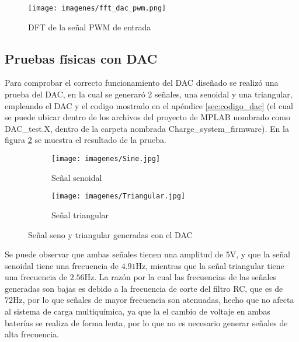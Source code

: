     \begin{figure}[H]
        \centering
        \texttt{[image: imagenes/fft\_dac\_pwm.png]}
        \caption{DFT de la señal PWM de entrada}
        \label{fig:sim_dac_fft_in}
    \end{figure}

    \subsection{Pruebas físicas con DAC}

    Para comprobar el correcto funcionamiento del DAC diseñado se realizó una
    prueba del DAC, en la cual se generaró 2 señales, una senoidal y una triangular,
    empleando el DAC y el codigo mostrado en el apéndice \ref{sec:codigo_dac} (el cual 
    se puede ubicar dentro de los archivos del proyecto de MPLAB nombrado como
    DAC\_test.X, dentro de la carpeta nombrada Charge\_system\_firmware).
     En la figura \ref{fig:dac_test_sine}
    se muestra el resultado de la prueba.
    
     \begin{figure}[H]
        \centering

        \begin{subfigure}{0.45\textwidth}
            \centering
            \texttt{[image: imagenes/Sine.jpg]}
            \caption{Señal senoidal}
        \end{subfigure}
        \begin{subfigure}{0.45\textwidth}
            \centering
            \texttt{[image: imagenes/Triangular.jpg]}
            \caption{Señal triangular}
        \end{subfigure}

        \caption{Señal seno y triangular generadas con el DAC}
        \label{fig:dac_test_sine}
     \end{figure}

     Se puede observar que ambas señales
     tienen una amplitud de $5\text{V}$, y que la señal senoidal tiene una frecuencia
     de $4.91\text{Hz}$, mientras que la señal triangular tiene una frecuencia de
     $2.56\text{Hz}$. La razón por la cual las frecuencias de las señales generadas
     son bajas es debido a la frecuencia de corte del filtro RC, que es de $72\text{Hz}$,
     por lo que señales de mayor frecuencia son atenuadas, hecho que no afecta 
     al sistema de carga multiquímica, ya que la el cambio de voltaje  
     en ambas baterías se realiza de forma lenta, por lo que no es necesario
     generar señales de alta frecuencia.
 